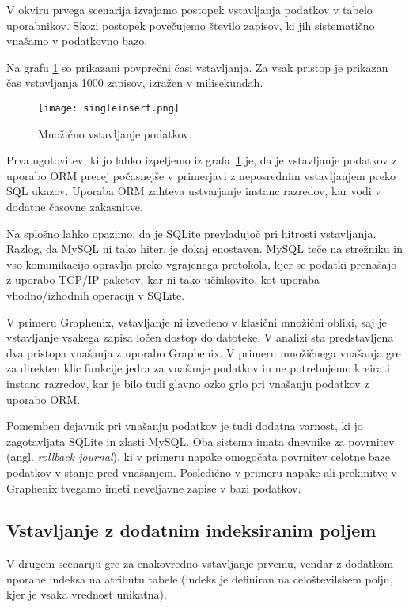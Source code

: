 \documentclass[a4paper,12pt,openright]{book}
\begin{document}
    V okviru prvega scenarija izvajamo postopek vstavljanja podatkov v tabelo uporabnikov. Skozi postopek povečujemo število zapisov, ki jih sistematično vnašamo v podatkovno bazo.

    Na grafu \ref{vnos} so prikazani povprečni časi vstavljanja. Za vsak pristop je prikazan čas vstavljanja 1000 zapisov, izražen v milisekundah.
   
   \begin{figure}[H]
        \centerline{\texttt{[image: singleinsert.png]}}
        \caption{Množično vstavljanje podatkov.}
        \label{vnos}
    \end{figure}

    \noindent
    Prva ugotovitev, ki jo lahko izpeljemo iz grafa~\ref{vnos} je, da je vstavljanje podatkov z uporabo ORM precej počasnejše v primerjavi z neposrednim vstavljanjem preko SQL ukazov. Uporaba ORM zahteva ustvarjanje instanc razredov, kar vodi v dodatne časovne zakasnitve.

    Na splošno lahko opazimo, da je SQLite prevladujoč pri hitrosti vstavljanja. Razlog, da MySQL ni tako hiter, je dokaj enostaven. MySQL teče na strežniku in vso komunikacijo opravlja preko vgrajenega protokola, kjer se podatki prenašajo z uporabo TCP/IP paketov, kar ni tako učinkovito, kot uporaba vhodno/izhodnih operaciji v SQLite.

    V primeru Graphenix, vstavljanje ni izvedeno v klasični množični obliki, saj je vstavljanje vsakega zapisa ločen dostop do datoteke. V analizi sta predstavljena dva pristopa vnašanja z uporabo Graphenix. V primeru množičnega vnašanja gre za direkten klic funkcije jedra za vnašanje podatkov in ne potrebujemo kreirati instanc razredov, kar je bilo tudi glavno ozko grlo pri vnašanju podatkov z uporabo ORM.

    Pomemben dejavnik pri vnašanju podatkov je tudi dodatna varnost, ki jo zagotavljata SQLite in zlasti MySQL. Oba sistema imata dnevnike za povrnitev (angl. \textit{rollback journal}), ki v primeru napake omogočata povrnitev celotne baze podatkov v stanje pred vnašanjem. Posledično v primeru napake ali prekinitve v Graphenix tvegamo imeti neveljavne zapise v bazi podatkov.

    \subsection{Vstavljanje z dodatnim indeksiranim poljem}

    V drugem scenariju gre za enakovredno vstavljanje prvemu, vendar z dodatkom uporabe indeksa na atributu tabele (indeks je definiran na celoštevilskem polju, kjer je vsaka vrednost unikatna).
    
\end{document}
